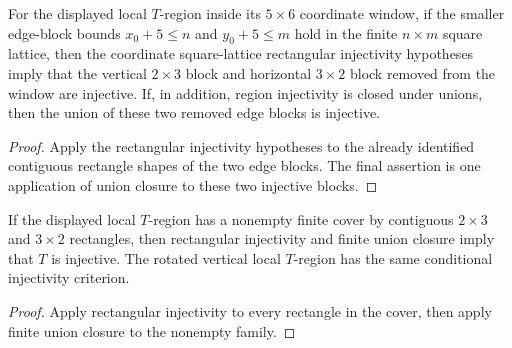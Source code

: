 \begin{lemma}%
    \label{lem:peps_normalSquareRegionT_edgeBlocks_injective}
    \leanok
    For the displayed local $T$-region inside its $5\times6$ coordinate window,
    if the smaller edge-block bounds
    $x_0 + 5 \leq n$ and $y_0 + 5 \leq m$ hold in the finite $n\times m$
    square lattice, then the coordinate square-lattice rectangular injectivity
    hypotheses imply that the vertical $2\times3$ block and horizontal
    $3\times2$ block removed from the window are injective. If, in addition,
    region injectivity is closed under unions, then the union of these two
    removed edge blocks is injective.
\end{lemma}
\begin{proof}\leanok
    Apply the rectangular injectivity hypotheses to the already identified
    contiguous rectangle shapes of the two edge blocks. The final assertion is
    one application of union closure to these two injective blocks.
\end{proof}

\begin{lemma}%
    \label{lem:peps_normalSquareRegionT_injective_of_cover}
    \leanok
    If the displayed local $T$-region has a nonempty finite cover by
    contiguous $2\times3$ and $3\times2$ rectangles, then rectangular
    injectivity and finite union closure imply that $T$ is injective. The
    rotated vertical local $T$-region has the same conditional injectivity
    criterion.
\end{lemma}
\begin{proof}\leanok
    Apply rectangular injectivity to every rectangle in the cover, then apply
    finite union closure to the nonempty family.
\end{proof}


